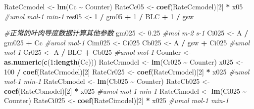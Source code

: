 \documentclass[
]{krantz}
\makeatletter
\newenvironment{Shaded}{\begin{snugshade}}{\end{snugshade}}
\newcommand{\CommentTok}[1]{\textcolor[rgb]{0.56,0.35,0.01}{\textit{#1}}}
\newcommand{\DecValTok}[1]{\textcolor[rgb]{0.00,0.00,0.81}{#1}}
\newcommand{\FloatTok}[1]{\textcolor[rgb]{0.00,0.00,0.81}{#1}}
\newcommand{\KeywordTok}[1]{\textcolor[rgb]{0.13,0.29,0.53}{\textbf{#1}}}
\newcommand{\NormalTok}[1]{#1}
\newcommand{\OperatorTok}[1]{\textcolor[rgb]{0.81,0.36,0.00}{\textbf{#1}}}
\newcommand{\StringTok}[1]{\textcolor[rgb]{0.31,0.60,0.02}{#1}}
\newenvironment{kframe}{%
\medskip{}
\setlength{\fboxsep}{.8em}
 \def\at@end@of@kframe{}%
 \ifinner\ifhmode%
  \def\at@end@of@kframe{\end{minipage}}%
  \begin{minipage}{\columnwidth}%
 \fi\fi%
 \def\FrameCommand##1{\hskip\@totalleftmargin \hskip-\fboxsep
 \colorbox{shadecolor}{##1}\hskip-\fboxsep
     \hskip-\linewidth \hskip-\@totalleftmargin \hskip\columnwidth}%
 \MakeFramed {\advance\hsize-\width
   \@totalleftmargin\z@ \linewidth\hsize
   \@setminipage}}%
 {\par\unskip\endMakeFramed%
 \at@end@of@kframe}
\renewenvironment{Shaded}{\begin{kframe}}{\end{kframe}}
\makeatother
\begin{document}
\begin{Shaded}
\begin{Highlighting}[]
\NormalTok{RateCcmodel \textless{}{-}}\StringTok{ }\KeywordTok{lm}\NormalTok{(Cc }\OperatorTok{\textasciitilde{}}\StringTok{ }\NormalTok{Counter)}
\NormalTok{RateCc05 \textless{}{-}}\StringTok{ }\KeywordTok{coef}\NormalTok{(RateCcmodel)[}\DecValTok{2}\NormalTok{] }\OperatorTok{*}\StringTok{ }\NormalTok{x05 }\CommentTok{\#umol mol{-}1 min{-}1}
\NormalTok{res05 \textless{}{-}}\StringTok{ }\DecValTok{1} \OperatorTok{/}\StringTok{ }\NormalTok{gm05 }\OperatorTok{+}\StringTok{ }\DecValTok{1} \OperatorTok{/}\StringTok{ }\NormalTok{BLC }\OperatorTok{+}\StringTok{ }\DecValTok{1} \OperatorTok{/}\StringTok{ }\NormalTok{gsw}

\CommentTok{\#正常的叶肉导度数据计算其他参数}
\NormalTok{gm025 \textless{}{-}}\StringTok{ }\FloatTok{0.25} \CommentTok{\#mol m{-}2 s{-}1}
\NormalTok{Ci025 \textless{}{-}}\StringTok{ }\NormalTok{A }\OperatorTok{/}\StringTok{ }\NormalTok{gm025 }\OperatorTok{+}\StringTok{ }\NormalTok{Cc }\CommentTok{\#umol mol{-}1}
\NormalTok{Cim025 \textless{}{-}}\StringTok{ }\NormalTok{Ci025}
\NormalTok{Cb025 \textless{}{-}}\StringTok{ }\NormalTok{A }\OperatorTok{/}\StringTok{ }\NormalTok{gsw }\OperatorTok{+}\StringTok{ }\NormalTok{Ci025 }\CommentTok{\#umol mol{-}1}
\NormalTok{Cr025 \textless{}{-}}\StringTok{ }\NormalTok{A }\OperatorTok{/}\StringTok{ }\NormalTok{BLC }\OperatorTok{+}\StringTok{ }\NormalTok{Cb025 }\CommentTok{\#umol mol{-}1}
\NormalTok{Counter \textless{}{-}}\StringTok{ }\KeywordTok{as.numeric}\NormalTok{(}\KeywordTok{c}\NormalTok{(}\DecValTok{1}\OperatorTok{:}\KeywordTok{length}\NormalTok{(Cc)))}
\NormalTok{RateCrmodel \textless{}{-}}\StringTok{ }\KeywordTok{lm}\NormalTok{(Cr025 }\OperatorTok{\textasciitilde{}}\StringTok{ }\NormalTok{Counter)}
\NormalTok{x025 \textless{}{-}}\StringTok{ }\DecValTok{100} \OperatorTok{/}\StringTok{ }\KeywordTok{coef}\NormalTok{(RateCrmodel)[}\DecValTok{2}\NormalTok{]}
\NormalTok{RateCr025 \textless{}{-}}\StringTok{ }\KeywordTok{coef}\NormalTok{(RateCrmodel)[}\DecValTok{2}\NormalTok{] }\OperatorTok{*}\StringTok{ }\NormalTok{x025 }\CommentTok{\#umol mol{-}1 min{-}1}
\NormalTok{RateCbmodel \textless{}{-}}\StringTok{ }\KeywordTok{lm}\NormalTok{(Cb025 }\OperatorTok{\textasciitilde{}}\StringTok{ }\NormalTok{Counter)}
\NormalTok{RateCb025 \textless{}{-}}\StringTok{ }\KeywordTok{coef}\NormalTok{(RateCbmodel)[}\DecValTok{2}\NormalTok{] }\OperatorTok{*}\StringTok{ }\NormalTok{x025 }\CommentTok{\#umol mol{-}1 min{-}1}
\NormalTok{RateCimodel \textless{}{-}}\StringTok{ }\KeywordTok{lm}\NormalTok{(Ci025 }\OperatorTok{\textasciitilde{}}\StringTok{ }\NormalTok{Counter)}
\NormalTok{RateCi025 \textless{}{-}}\StringTok{ }\KeywordTok{coef}\NormalTok{(RateCimodel)[}\DecValTok{2}\NormalTok{] }\OperatorTok{*}\StringTok{ }\NormalTok{x025 }\CommentTok{\#umol mol{-}1 min{-}1}

\end{Highlighting}
\end{Shaded}
\end{document}
